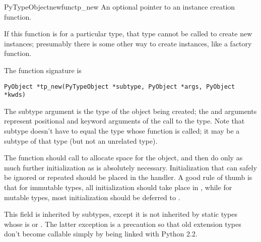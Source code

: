 \begin{cmemberdesc}{PyTypeObject}{newfunc}{tp_new}
  An optional pointer to an instance creation function.

  If this function is \NULL{} for a particular type, that type cannot
  be called to create new instances; presumably there is some other
  way to create instances, like a factory function.

  The function signature is

\begin{verbatim}
PyObject *tp_new(PyTypeObject *subtype, PyObject *args, PyObject *kwds)
\end{verbatim}

  The subtype argument is the type of the object being created; the
   and  arguments represent positional and keyword
  arguments of the call to the type.  Note that subtype doesn't have
  to equal the type whose  function is called; it may
  be a subtype of that type (but not an unrelated type).

  The  function should call
   to
  allocate space for the object, and then do only as much further
  initialization as is absolutely necessary.  Initialization that can
  safely be ignored or repeated should be placed in the
   handler.  A good rule of thumb is that for
  immutable types, all initialization should take place in
  , while for mutable types, most initialization should
  be deferred to .

  This field is inherited by subtypes, except it is not inherited by
  static types whose  is \NULL{} or
  .  The latter exception is a precaution so
  that old extension types don't become callable simply by being
  linked with Python 2.2.
\end{cmemberdesc}

